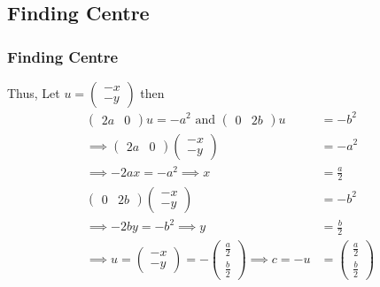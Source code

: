 \documentclass{beamer}
\theoremstyle{remark}
\newcommand{\myvec}[1]{\ensuremath{\begin{pmatrix}#1\end{pmatrix}}}
\numberwithin{equation}{section}
\begin{document}
\subsection{Finding Centre}
\begin{frame}[fragile]
\frametitle{Finding Centre}
Thus, 
Let $u=\myvec{-x\\-y}$ then
\begin{align}
    \myvec{2a&0}u=-a^2\text{ and }\myvec{0&2b}u&=-b^2\\ 
    \implies\myvec{2a&0}\myvec{-x\\-y}&=-a^2\\
    \implies-2ax=-a^2\implies x&=\frac{a}{2}\\
    \myvec{0&2b}\myvec{-x\\-y}&=-b^2\\
    \implies-2by=-b^2\implies y&=\frac{b}{2}\\
    \implies u=\myvec{-x\\-y}=-\myvec{\frac{a}{2}\\ \frac{b}{2}}
    \implies c=-u&=\myvec{\frac{a}{2}\\ \frac{b}{2}}
\end{align}
\end{frame}
\end{document}
